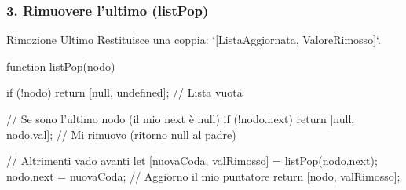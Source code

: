 \subsubsection{3. Rimuovere l'ultimo (listPop)}
\begin{concept}{Rimozione Ultimo}
Restituisce una coppia: `[ListaAggiornata, ValoreRimosso]`.
\end{concept}
\begin{jsbox}
function listPop(nodo) {
    if (!nodo) return [null, undefined]; // Lista vuota
    
    // Se sono l'ultimo nodo (il mio next è null)
    if (!nodo.next) {
        return [null, nodo.val]; // Mi rimuovo (ritorno null al padre)
    }
    
    // Altrimenti vado avanti
    let [nuovaCoda, valRimosso] = listPop(nodo.next);
    nodo.next = nuovaCoda; // Aggiorno il mio puntatore
    return [nodo, valRimosso];
}
\end{jsbox}
